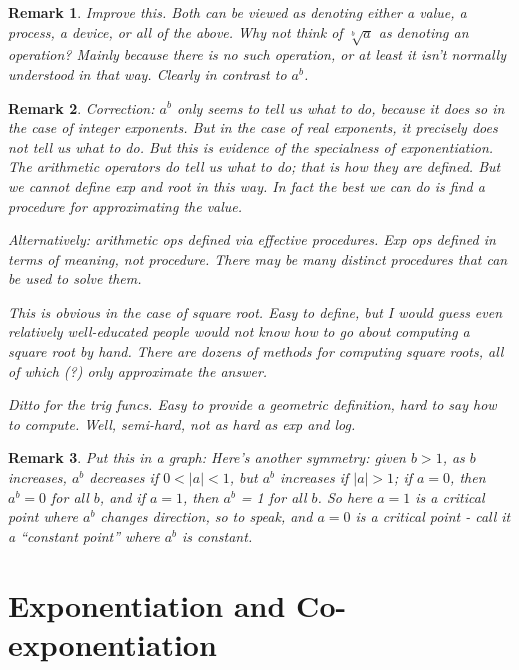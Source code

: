 \documentclass[reqno,12pt]{tufte-book}
\numberwithin{equation}{subsection}
\newtheorem{remark}{Remark}
\begin{document}
\begin{remark}
  Improve this.  Both can be viewed as denoting either a value, a
  process, a device, or all of the above.  Why not think of
  $\sqrt[b]{a}$ as denoting an operation?  Mainly because there is no
  such operation, or at least it isn't normally understood in that
  way.  Clearly in contrast to $a^b$.
\end{remark}

\begin{remark}
  Correction: $a^b$ only \textit{seems} to tell us what to do, because
  it does so in the case of integer exponents.  But in the case of
  real exponents, it precisely does \textit{not} tell us what to do.
  But this is evidence of the specialness of exponentiation.  The
  arithmetic operators do tell us what to do; that is how they are
  defined.  But we \textit{cannot} define exp and root in this way.
  In fact the best we can do is find a procedure for approximating the
  value.

  Alternatively: arithmetic ops defined via effective procedures.  Exp
  ops defined in terms of meaning, not procedure.  There may be many
  distinct procedures that can be used to solve them.

  This is obvious in the case of square root.  Easy to define, but I
  would guess even relatively well-educated people would not know how
  to go about computing a square root by hand.  There are dozens of
  methods for computing square roots, all of which (?) only
  approximate the answer.

  Ditto for the trig funcs.  Easy to provide a geometric definition,
  hard to say how to compute.  Well, semi-hard, not as hard as exp and
  log.

\end{remark}


\begin{remark}
  Put this in a graph: Here's another symmetry: given $b>1$, as $b$
  increases, $a^b$ decreases if $0<|a|<1$, but $a^b$ increases if
  $|a|>1$; if $a=0$, then $a^b=0$ for all $b$, and if $a=1$, then
  $a^b$ = 1 for all $b$.  So here $a=1$ is a critical point where
  $a^b$ changes direction, so to speak, and $a=0$ is a critical point
  - call it a ``constant point'' where $a^b$ is constant.

\end{remark}



\section{Exponentiation and Co-exponentiation}
\end{document}
